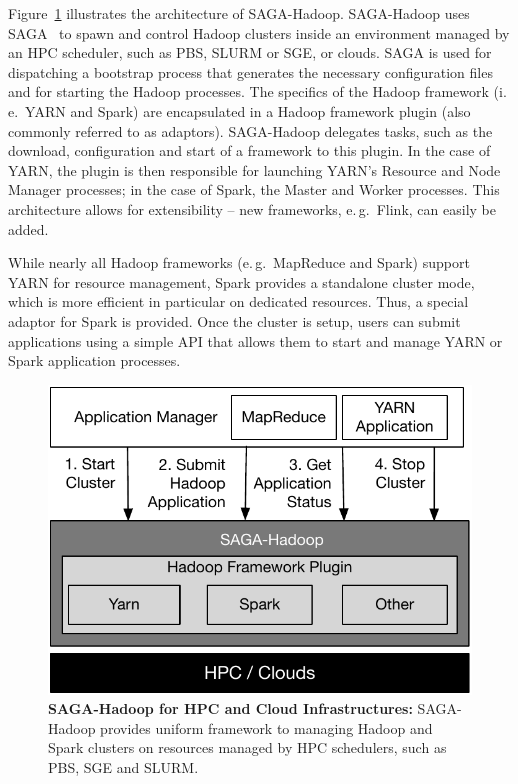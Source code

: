 Figure~\ref{fig:saga-hadoop} illustrates the architecture of SAGA-Hadoop.
SAGA-Hadoop uses SAGA~\cite{merzky2015saga} to spawn and control Hadoop clusters inside an environment managed by an HPC scheduler, such as PBS, SLURM or SGE, or clouds.
SAGA is used for dispatching a bootstrap process that generates the necessary configuration files and for starting the Hadoop processes.
The specifics of the Hadoop framework (i.\,e.\ YARN and Spark) are encapsulated in a Hadoop framework plugin (also commonly referred to as adaptors).
SAGA-Hadoop delegates tasks, such as the download, configuration and start of a framework to this plugin.
In the case of YARN, the plugin is then responsible for launching YARN's Resource and Node Manager processes; in the case of Spark, the Master and Worker processes.
This architecture allows for extensibility -- new frameworks, e.\,g.\ Flink, can easily be added.

While nearly all Hadoop frameworks (e.\,g.\ MapReduce and Spark) support YARN for resource management, Spark provides a standalone cluster mode, which is more efficient in particular on dedicated resources.
Thus, a special adaptor for Spark is provided.
Once the cluster is setup, users can submit applications using a simple API that allows them to start and manage YARN or Spark application processes.

\begin{figure}[t]
    \centering
    \includegraphics[width=.95\textwidth]{figures/data_analytics_hpc/hpc_hadoop/pilot-abds.pdf}
    \caption{\textbf{SAGA-Hadoop for HPC and Cloud Infrastructures:} 
        SAGA-Hadoop provides  uniform framework to managing Hadoop and Spark clusters on resources managed by HPC schedulers, such as PBS, SGE and SLURM.}
    \label{fig:saga-hadoop}
\end{figure}

